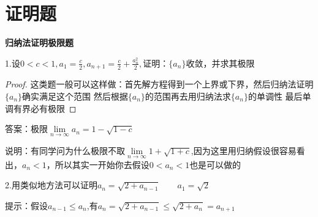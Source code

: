 \documentclass[12pt, a4paper]{ctexart}
\begin{document}
\section{证明题}
    \begin{flushleft}
    
    {\bfseries 归纳法证明极限题}

    1.设$0<c<1,a_1 = \frac{c}{2},a_{n+1}=\frac{c}{2}+\frac{a_n^2}{2},$证明：$\{a_n\}$收敛，并求其极限
    \begin{proof} %
    这类题一般可以这样做：首先解方程得到一个上界或下界，然后归纳法证明$\{a_n\}$确实满足这个范围
    然后根据$\{a_n\}$的范围再去用归纳法求$\{a_n\}$的单调性
    最后单调有界必有极限
    \end{proof}
    \par
    \par
    答案：极限$\lim \limits _{n \rightarrow \infty} a_n = 1 - \sqrt{1-c}$
    \par
    说明：有同学问为什么极限不取$\lim \limits _{n \rightarrow \infty}1+\sqrt{1+c}$,因为这里用归纳假设很容易看出，$a_n < 1$，所以其实一开始你去假设$0 < a_n < 1$也是可以做的


    2.用类似地方法可以证明$a_n = \sqrt{2 + a_{n-1}}\qquad a_1=\sqrt{2}$

    提示：假设$a_{n-1} \leq a_{n}$,有$a_n = \sqrt{2+a_{n-1}} \leq \sqrt{2+a_{n} }= a_{n+1}$
    \end{flushleft}
\end{document}
